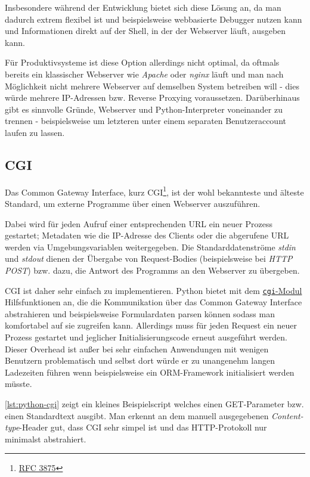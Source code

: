 Insbesondere während der Entwicklung bietet sich diese Lösung an, da man dadurch extrem flexibel
ist und beispielsweise webbasierte Debugger nutzen kann und Informationen direkt auf der Shell, in
der der Webserver läuft, ausgeben kann.

Für Produktivsysteme ist diese Option allerdings nicht optimal, da oftmals bereits ein klassischer
Webserver wie \emph{Apache} oder \emph{nginx} läuft und man nach Möglichkeit nicht mehrere Webserver
auf demselben System betreiben will - dies würde mehrere IP-Adressen bzw. Reverse Proxying
voraussetzen. Darüberhinaus gibt es sinnvolle Gründe, Webserver und Python-Interpreter voneinander
zu trennen - beispielsweise um letzteren unter einem separaten Benutzeraccount laufen zu lassen.

\subsection{CGI}

Das Common Gateway Interface, kurz CGI\footnote{\href{http://www.ietf.org/rfc/rfc3875}{RFC 3875}},
ist der wohl bekannteste und älteste Standard, um externe Programme über einen Webserver
auszuführen.

Dabei wird für jeden Aufruf einer entsprechenden URL ein neuer Prozess gestartet; Metadaten wie die
IP-Adresse des Clients oder die abgerufene URL werden via Umgebungsvariablen weitergegeben. Die
Standarddatenströme \emph{stdin} und \emph{stdout} dienen der Übergabe von Request-Bodies
(beispielsweise bei \emph{HTTP POST}) bzw. dazu, die Antwort des Programms an den Webserver
zu übergeben.

CGI ist daher sehr einfach zu implementieren. Python bietet mit dem
\href{http://docs.python.org/library/cgi.html}{\lstinline{cgi}-Modul} Hilfsfunktionen an, die die
Kommunikation über das Common Gateway Interface abstrahieren und beispielsweise Formulardaten
parsen können sodass man komfortabel auf sie zugreifen kann. Allerdings muss für jeden Request ein
neuer Prozess gestartet und jeglicher Initialisierungscode erneut ausgeführt werden. Dieser Overhead
ist außer bei sehr einfachen Anwendungen mit wenigen Benutzern problematisch und selbst dort würde
er zu unangenehm langen Ladezeiten führen wenn beispielsweise ein ORM-Framework initialisiert werden
müsste.

\autoref{lst:python-cgi} zeigt ein kleines Beispielscript welches einen GET-Parameter bzw. einen
Standardtext ausgibt. Man erkennt an dem manuell ausgegebenen \emph{Content-type}-Header gut, dass
CGI sehr simpel ist und das HTTP-Protokoll nur minimalst abstrahiert.

